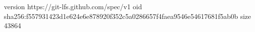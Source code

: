 version https://git-lfs.github.com/spec/v1
oid sha256:f557931423d1e624e6e878920f352c5a0286657f4faea9546e54617681f5ab0b
size 43864
